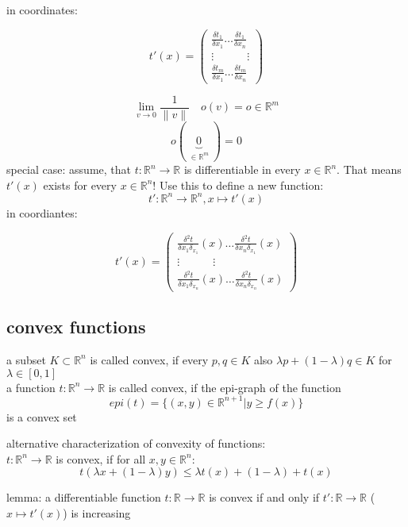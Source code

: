 in coordinates:

\[ t'(x) =\left( \begin{array}{ccc}
\frac{\delta t_1}{\delta x_1} \dots  \frac{\delta t_1}{\delta x_n}\\
\vdots \quad \quad \quad \vdots\\
\frac{\delta t_m}{\delta x_1} \dots  \frac{\delta t_m}{\delta x_n} \end{array} \right)\] 


\[\lim_{v \rightarrow 0} \frac{1}{\lVert v \lVert} \quad o(v) = o \in \mathbb{R}^m \]
\[o(\underbrace{0}_{\substack{\in \mathbb{R}^m}})= 0\]
special case: assume, that $t: \mathbb{R}^n \rightarrow \mathbb{R}$ is differentiable in every $x \in \mathbb{R}^n$. That means $t'(x)$ exists for every $x \in \mathbb{R}^n$! Use this to define a new function:
\[t': \mathbb{R}^n \rightarrow \mathbb{R}^n , x \mapsto t'(x)\]
in coordiantes:

\[ t'(x) =\left( \begin{array}{ccc}
\frac{\delta^2 t}{\delta x_1 \delta_{x_1}}(x) \dots  \frac{\delta^2 t}{\delta x_n \delta_{x_1}}(x)\\
\vdots \quad \quad \quad \vdots\\
\frac{\delta^2 t}{\delta x_1 \delta_{x_n}}(x) \dots  \frac{\delta^2 t}{\delta x_n \delta_{x_n}}(x) \end{array} \right)\]

\subsection*{convex functions}
a subset $K \subset \mathbb{R}^n$ is called convex, if every $p,q \in K$ also $\lambda p + (1-\lambda) q \in K$ for $\lambda \in [0,1]$\\


a function $t:\mathbb{R}^n \rightarrow \mathbb{R}$ is called convex, if the epi-graph of the function 
\[epi(t) = \{(x,y) \in \mathbb{R}^{n+1} | y \geq f(x)\}\]
is a convex set


alternative characterization of convexity of functions:\\
$t: \mathbb{R}^n \rightarrow \mathbb{R}$ is convex, if for all $x,y \in \mathbb{R}^n$:
\[t(\lambda x + (1-\lambda)y) \leq \lambda t(x) + (1-\lambda) + t(x)\]

\begin{framed}
lemma: a differentiable function $t: \mathbb{R} \rightarrow \mathbb{R}$ is convex if and only if $t':\mathbb{R} \rightarrow \mathbb{R}$ ($x \mapsto t'(x)$) is increasing
\end{framed}

